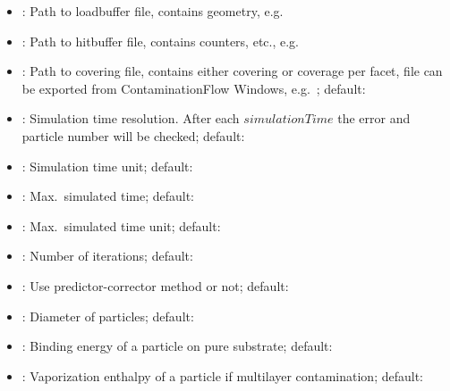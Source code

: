 \begin{itemize}[noitemsep,topsep=0pt, partopsep=0pt]
\item {}: Path to loadbuffer file, contains geometry, e.g.\ 
\item {}: Path to hitbuffer file, contains counters, etc., e.g.\ 
\item {}: Path to covering file, contains either covering or coverage per facet, file can be exported from ContaminationFlow Windows, e.g.\ ; default: 
\item {}: Simulation time resolution. After each $simulationTime$ the error and particle number will be checked; default: 
\item {}: Simulation time unit; default: 
\item {}: Max.\ simulated time; default: 
\item {}: Max.\ simulated time unit; default: 
\item {}: Number of iterations; default: 
\item {}: Use predictor-corrector method or not; default: 
\item {}: Diameter of particles; default:
\item {}: Binding energy of a particle on pure substrate; default:
\item {}: Vaporization enthalpy of a particle if multilayer contamination; default:

\end{itemize}
